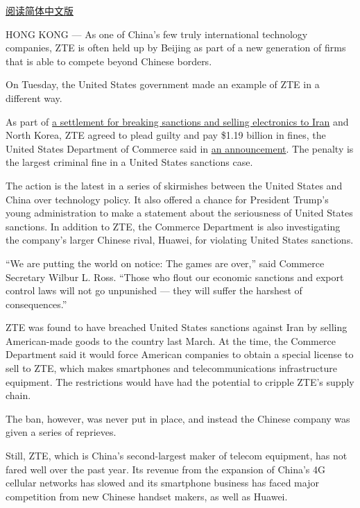 \href{http://cn.nytimes3xbfgragh.onion/business/20170308/zte-china-fine/}{阅读简体中文版}

HONG KONG --- As one of China's few truly international technology
companies, ZTE is often held up by Beijing as part of a new generation
of firms that is able to compete beyond Chinese borders.

On Tuesday, the United States government made an example of ZTE in a
different way.

As part of
\href{https://www.nytimes3xbfgragh.onion/2016/03/08/technology/us-restricts-sales-to-zte-saying-it-breached-sanctions.html}{a
settlement for breaking sanctions and selling electronics to Iran} and
North Korea, ZTE agreed to plead guilty and pay \$1.19 billion in fines,
the United States Department of Commerce said in
\href{https://www.commerce.gov/news/press-releases/2017/03/secretary-commerce-wilbur-l-ross-jr-announces-119-billion-penalty}{an
announcement}. The penalty is the largest criminal fine in a United
States sanctions case.

The action is the latest in a series of skirmishes between the United
States and China over technology policy. It also offered a chance for
President Trump's young administration to make a statement about the
seriousness of United States sanctions. In addition to ZTE, the Commerce
Department is also investigating the company's larger Chinese rival,
Huawei, for violating United States sanctions.

``We are putting the world on notice: The games are over,'' said
Commerce Secretary Wilbur L. Ross. ``Those who flout our economic
sanctions and export control laws will not go unpunished --- they will
suffer the harshest of consequences.''

ZTE was found to have breached United States sanctions against Iran by
selling American-made goods to the country last March. At the time, the
Commerce Department said it would force American companies to obtain a
special license to sell to ZTE, which makes smartphones and
telecommunications infrastructure equipment. The restrictions would have
had the potential to cripple ZTE's supply chain.

The ban, however, was never put in place, and instead the Chinese
company was given a series of reprieves.

Still, ZTE, which is China's second-largest maker of telecom equipment,
has not fared well over the past year. Its revenue from the expansion of
China's 4G cellular networks has slowed and its smartphone business has
faced major competition from new Chinese handset makers, as well as
Huawei.

